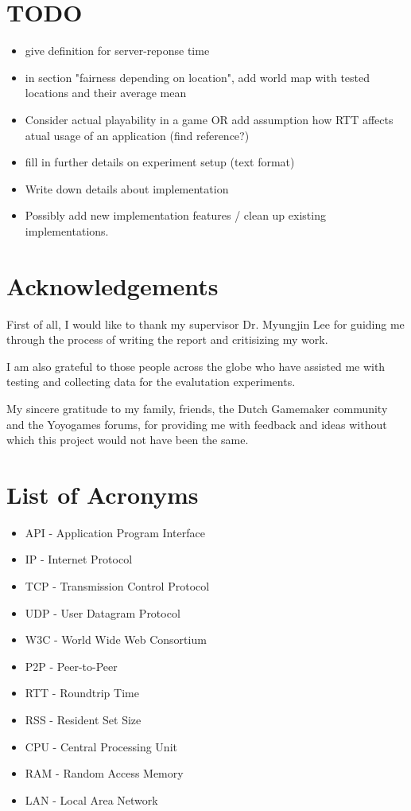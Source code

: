 \documentclass[bsc,frontabs,twoside,singlespacing,parskip,deptreport]{infthesis}     %
\begin{document}
\section*{TODO}
\begin{itemize}
\item give definition for server-reponse time
\item in section "fairness depending on location", add world map with tested locations and their average mean
\item Consider actual playability in a game OR add assumption how RTT affects atual usage of an application (find reference?)
\item fill in further details on experiment setup (text format)
\item Write down details about implementation
\item Possibly add new implementation features / clean up existing implementations.
\end{itemize}

\pagebreak
\section*{Acknowledgements}
First of all, I would like to thank my supervisor Dr. Myungjin Lee for guiding me through the process of writing the report and critisizing my work.

I am also grateful to those people across the globe who have assisted me with testing and collecting data for the evalutation experiments.

My sincere gratitude to my family, friends, the Dutch Gamemaker community and the Yoyogames forums, for providing me with feedback and ideas without which this project would not have been the same.

\section*{List of Acronyms}
\begin{itemize}
\item API - Application Program Interface
\item IP - Internet Protocol
\item TCP - Transmission Control Protocol
\item UDP - User Datagram Protocol
\item W3C - World Wide Web Consortium
\item P2P - Peer-to-Peer
\item RTT - Roundtrip Time
\item RSS - Resident Set Size
\item CPU - Central Processing Unit
\item RAM - Random Access Memory
\item LAN - Local Area Network
\end{itemize}
\end{document}
